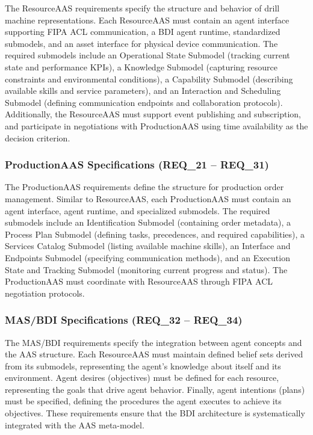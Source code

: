 The ResourceAAS requirements specify the structure and behavior of drill machine representations. Each ResourceAAS must contain an agent interface supporting FIPA \ac{ACL} communication, a \ac{BDI} agent runtime, standardized submodels, and an asset interface for physical device communication. The required submodels include an Operational State Submodel (tracking current state and performance KPIs), a Knowledge Submodel (capturing resource constraints and environmental conditions), a Capability Submodel (describing available skills and service parameters), and an Interaction and Scheduling Submodel (defining communication endpoints and collaboration protocols). Additionally, the ResourceAAS must support event publishing and subscription, and participate in negotiations with ProductionAAS using time availability as the decision criterion.

\subsubsection{ProductionAAS Specifications (REQ\_21 -- REQ\_31)}

The ProductionAAS requirements define the structure for production order management. Similar to ResourceAAS, each ProductionAAS must contain an agent interface, agent runtime, and specialized submodels. The required submodels include an Identification Submodel (containing order metadata), a Process Plan Submodel (defining tasks, precedences, and required capabilities), a Services Catalog Submodel (listing available machine skills), an Interface and Endpoints Submodel (specifying communication methods), and an Execution State and Tracking Submodel (monitoring current progress and status). The ProductionAAS must coordinate with ResourceAAS through FIPA \ac{ACL} negotiation protocols.

\subsubsection{MAS/BDI Specifications (REQ\_32 -- REQ\_34)}

The \ac{MAS}/\ac{BDI} requirements specify the integration between agent concepts and the \ac{AAS} structure. Each ResourceAAS must maintain defined belief sets derived from its submodels, representing the agent's knowledge about itself and its environment. Agent desires (objectives) must be defined for each resource, representing the goals that drive agent behavior. Finally, agent intentions (plans) must be specified, defining the procedures the agent executes to achieve its objectives. These requirements ensure that the \ac{BDI} architecture is systematically integrated with the \ac{AAS} meta-model.

